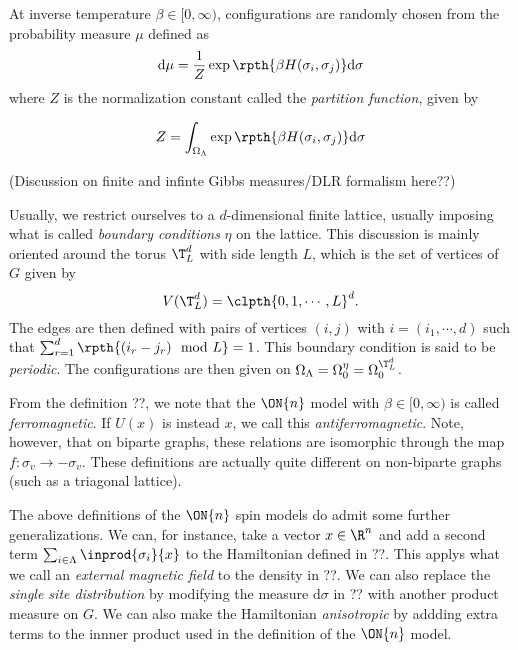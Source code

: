 	\begin{ndefi}
		At inverse temperature $\beta \in [0,\infty)$, configurations are randomly chosen from the 
		probability measure $\mu$ defined as
		\begin{equation}
			\mathrm{d}\mu = \frac{1}{Z} \exp\rpth{{\beta H(\sigma_i, \sigma_j)}} \mathrm{d}\sigma
		\end{equation}
		where $Z$ is the normalization constant called the \textit{partition function}, given by

		\begin{equation}
			Z = \int_{\Omega_{\Lambda}} \exp\rpth{\beta H(\sigma_i, \sigma_j)} \mathrm{d}\sigma
		\end{equation}
	\end{ndefi}

	(Discussion on finite and infinte Gibbs measures/DLR formalism here??)

	Usually, we restrict ourselves to a $d$-dimensional finite lattice, usually imposing what is called
	\textit{boundary conditions} $\eta$  on the lattice. This discussion is mainly oriented 
	around the torus $\T^d_L$ with side length $L$, which is the set of vertices of $G$ given by
	\[ V(\T^d_L) = \clpth{0,1,\cdots,L}^d. \]
	The edges are then defined with pairs of vertices $(i,j)$ with $i=(i_1,\cdots, d)$ such that 
	$\sum_{r=1}^{d} \rpth{ (i_r - j_r) \mod L } = 1$. This boundary condition is said to be 
	\textit{periodic}. The configurations are then given 
	on $\Omega_{\Lambda} = \Omega_0^{\eta} = \Omega_0^{\T^d_L}$. 

	From the definition ??, we note that the $\ON{n}$ model with $\beta \in [0,\infty)$ is called 
	\textit{ferromagnetic}. If $U(x)$ is instead $x$, we call this \textit{antiferromagnetic}. Note,
	however, that on biparte graphs, these relations are isomorphic through the map $f:\sigma_v 
	\rightarrow -\sigma_v$. These definitions are actually quite different on non-biparte graphs (such as
	a triagonal lattice).

	The above definitions of the $\ON{n}$ spin models do admit some further generalizations. We can, for 
	instance, take a vector $x \in \R^n$ and add a second term $\sum_{i \in \Lambda} 
	\inprod{\sigma_i}{x}$ to the Hamiltonian defined in ??. This applys  what we call an \textit{external 
	magnetic field} to the density in ??. We can also replace the \textit{single site distribution} by
	modifying the measure $\mathrm{d} \sigma$ in ?? with another product measure on $G$. We can also 
	make the Hamiltonian \textit{anisotropic} by addding extra terms to the innner product used in
	the definition of the $\ON{n}$ model. 

